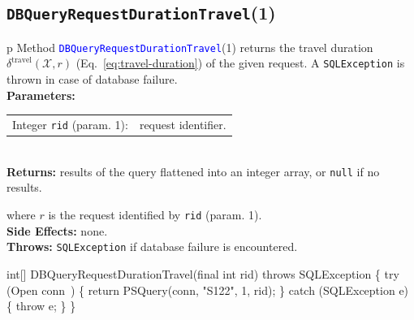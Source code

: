 \subsection{\texttt{DBQueryRequestDurationTravel}(1)}
\begin{tabular}{p{\textwidth}}
\toprule
{}
Method \textcolor{blue}{{\tt{}\protect{}DBQueryRequestDurationTravel}}(1) returns the
travel duration $\delta^\textrm{travel}(\mathcal{X},r)$
(Eq.~\ref{eq:travel-duration}) of the given request.
A {\tt{}SQLException} is thrown in case of database failure.\\
\midrule
\textbf{Parameters:}\\
\begin{tabular}{lp{116mm}}
Integer {\tt{}rid} (param. 1):&request identifier.
\end{tabular}\\
\textbf{Returns:} results of the query flattened into an integer array,
or {\tt{}null} if no results.


where $r$ is the request identified by {\tt{}rid} (param. 1).\\
\textbf{Side Effects:} none.\\
\textbf{Throws:} {\tt{}SQLException} if database failure is encountered.\\
\bottomrule
\end{tabular}
\nwenddocs{}\endmoddef{}
int[] DBQueryRequestDurationTravel(final int rid) throws SQLException \{
  try (\LA{}Open \code{}conn\edoc{}~{\nwtagstyle{}}\RA{}) \{
    return PSQuery(conn, "S122", 1, rid);
  \} catch (SQLException e) \{
    throw e;
  \}
\}
\eatline
{}\nwendcode{}\nwdocspar
